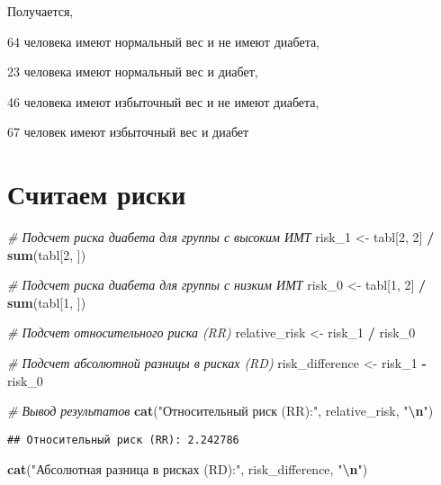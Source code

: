 \documentclass[
]{article}
\newenvironment{Shaded}{\begin{snugshade}}{\end{snugshade}}
\newcommand{\CommentTok}[1]{\textcolor[rgb]{0.56,0.35,0.01}{\textit{#1}}}
\newcommand{\DecValTok}[1]{\textcolor[rgb]{0.00,0.00,0.81}{#1}}
\newcommand{\FunctionTok}[1]{\textcolor[rgb]{0.13,0.29,0.53}{\textbf{#1}}}
\newcommand{\NormalTok}[1]{#1}
\newcommand{\OtherTok}[1]{\textcolor[rgb]{0.56,0.35,0.01}{#1}}
\newcommand{\SpecialCharTok}[1]{\textcolor[rgb]{0.81,0.36,0.00}{\textbf{#1}}}
\newcommand{\StringTok}[1]{\textcolor[rgb]{0.31,0.60,0.02}{#1}}
\begin{document}
Получается,

64 человека имеют нормальный вес и не имеют диабета,

23 человека имеют нормальный вес и диабет,

46 человека имеют избыточный вес и не имеют диабета,

67 человек имеют избыточный вес и диабет

\section{Считаем
риски}\label{ux441ux447ux438ux442ux430ux435ux43c-ux440ux438ux441ux43aux438}

\begin{Shaded}
\begin{Highlighting}[]
\CommentTok{\# Подсчет риска диабета для группы с высоким ИМТ}
\NormalTok{risk\_1 }\OtherTok{\textless{}{-}}\NormalTok{ tabl[}\DecValTok{2}\NormalTok{, }\DecValTok{2}\NormalTok{] }\SpecialCharTok{/} \FunctionTok{sum}\NormalTok{(tabl[}\DecValTok{2}\NormalTok{, ])}

\CommentTok{\# Подсчет риска диабета для группы с низким ИМТ}
\NormalTok{risk\_0 }\OtherTok{\textless{}{-}}\NormalTok{ tabl[}\DecValTok{1}\NormalTok{, }\DecValTok{2}\NormalTok{] }\SpecialCharTok{/} \FunctionTok{sum}\NormalTok{(tabl[}\DecValTok{1}\NormalTok{, ])}

\CommentTok{\# Подсчет относительного риска (RR)}
\NormalTok{relative\_risk }\OtherTok{\textless{}{-}}\NormalTok{ risk\_1 }\SpecialCharTok{/}\NormalTok{ risk\_0}

\CommentTok{\# Подсчет абсолютной разницы в рисках (RD)}
\NormalTok{risk\_difference }\OtherTok{\textless{}{-}}\NormalTok{ risk\_1 }\SpecialCharTok{{-}}\NormalTok{ risk\_0}

\CommentTok{\# Вывод результатов}
\FunctionTok{cat}\NormalTok{(}\StringTok{"Относительный риск (RR):"}\NormalTok{, relative\_risk, }\StringTok{"}\SpecialCharTok{\textbackslash{}n}\StringTok{"}\NormalTok{)}
\end{Highlighting}
\end{Shaded}

\begin{verbatim}
## Относительный риск (RR): 2.242786
\end{verbatim}

\begin{Shaded}
\begin{Highlighting}[]
\FunctionTok{cat}\NormalTok{(}\StringTok{"Абсолютная разница в рисках (RD):"}\NormalTok{, risk\_difference, }\StringTok{"}\SpecialCharTok{\textbackslash{}n}\StringTok{"}\NormalTok{)}
\end{Highlighting}
\end{Shaded}
\end{document}
